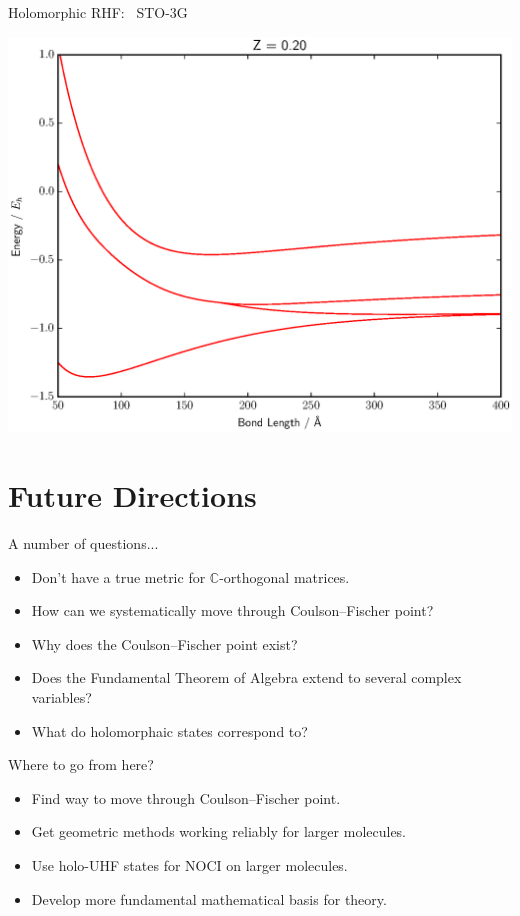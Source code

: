 \documentclass{beamer}
\begin{document}
\begin{frame}{Holomorphic RHF: \ STO-3G}
\vspace{-0.9em}
  \begin{center}
    \includegraphics[scale=0.45]{BFGS_RHF_HZ_0-20_sto-3g}
  \end{center}
\end{frame}

\section{Future Directions}
\begin{frame}{A number of questions...}
 \begin{itemize}
  \item{Don't have a true metric for $\mathbb{C}$-orthogonal matrices.}
  \item{How can we systematically move through Coulson--Fischer point?}
  \item{Why does the Coulson--Fischer point exist?}
  \item{Does the Fundamental Theorem of Algebra extend to several complex variables?}
  \item{What do holomorphaic states correspond to?}
 \end{itemize}
\end{frame}

\begin{frame}{Where to go from here?}
 \begin{itemize}
   \item{Find way to move through Coulson--Fischer point.}
   \item{Get geometric methods working \alert{reliably} for larger molecules.}
   \item{Use holo-UHF states for NOCI on larger molecules.}
   \item{Develop more fundamental mathematical basis for theory.}
 \end{itemize}
\end{frame}
\end{document}
